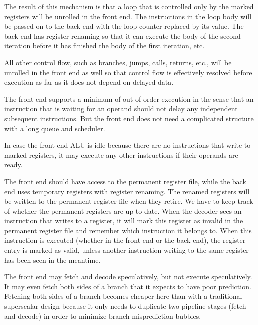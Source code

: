 \documentclass[forwardcom.tex]{subfiles}
\begin{document}
The result of this mechanism is that a loop that is controlled only by the marked registers
will be unrolled in the front end. The instructions in the loop body will be passed on to the back end with the loop counter replaced by its value. The back end has register renaming so that it can execute the body of the second iteration before it has finished the body of the first iteration, etc.
\vspace{2mm}

All other control flow, such as branches, jumps, calls, returns, etc., will be unrolled in the front end as well so that control flow is effectively resolved before execution as far as it does not depend on delayed data.
\vspace{2mm}

The front end supports a minimum of out-of-order execution in the sense that an instruction that is waiting for an operand should not delay any independent subsequent instructions. But the front end does not need a complicated structure with a long queue and scheduler.
\vspace{2mm}

In case the front end ALU is idle because there are no instructions that write to marked registers, it may execute any other instructions if their operands are ready.
\vspace{2mm}

The front end should have access to the permanent register file, while the back end uses temporary registers with register renaming. The renamed registers will be written to the permanent register file when they retire. We have to keep track of whether the permanent registers are up to date. When the decoder sees an instruction that writes to a register, it will mark this register as invalid in the permanent register file and remember which instruction it belongs to. When this instruction is executed (whether in the front end or the back end), the register entry is marked as valid, unless another instruction writing to the same register has been seen in the meantime.
\vspace{2mm}

The front end may fetch and decode speculatively, but not execute speculatively. It may even fetch both sides of a branch that it expects to have poor prediction. Fetching both sides of a branch becomes cheaper here than with a traditional superscalar design because it only needs to duplicate two pipeline stages (fetch and decode) in order to minimize branch misprediction bubbles.
\vspace{2mm}
\end{document}
